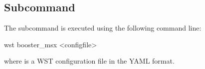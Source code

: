 
\fi

\subsection{ Subcommand}

The  subcommand is executed using the following command line:
\begin{unknownListing}
wst booster_msx <configfile> 
\end{unknownListing}
where  is a WST configuration file in the YAML format. 

